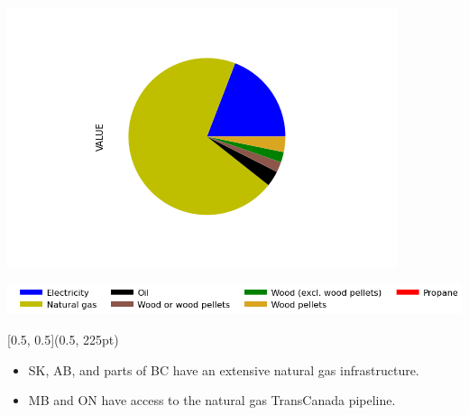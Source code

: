 \documentclass{beamer}
\begin{document}
\begin{frame}
\begin{minipage}[b]{0.2\textwidth}
\begin{center}
\includegraphics[width=\textwidth, trim={120pt 50pt 110pt 50pt}, clip]{../Ontario.png}%
\end{center}
\end{minipage}
\begin{center}
\includegraphics[width=0.8\linewidth]{leg_bar.png}
\end{center}

\begin{textblock*}{\textwidth}[0.5, 0.5](0.5\linewidth, 225pt)
\begin{itemize}
	\item SK, AB, and parts of BC have an extensive natural gas infrastructure.
	\item MB and ON have access to the natural gas TransCanada pipeline.
\end{itemize}
\end{textblock*}

\end{frame}
\end{document}
